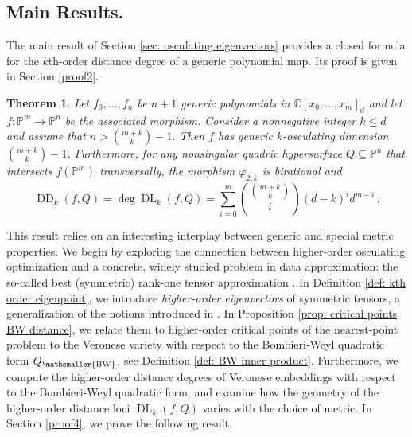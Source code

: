 \documentclass[11pt,reqno]{amsart}
\numberwithin{equation}{section}
\theoremstyle{plain}
\newtheorem{theorem}{Theorem}
\numberwithin{theorem}{section}
\theoremstyle{definition}
\renewcommand{\P}{\mathbb{P}}
\newcommand{\C}{\mathbb{C}}
\newcommand{\DL}{\operatorname{DL}}
\newcommand{\DD}{\operatorname{DD}}
\newcommand{\mBW}{\mathsmaller{\mathrm{BW}}}
\begin{document}
\subsection*{Main Results.} 

The main result of Section \ref{sec: osculating eigenvectors} provides a closed formula for the $k$th-order distance degree of a generic polynomial map. Its proof is given in Section \ref{proof2}.

\begin{theorem}\label{thm: generic ED degree general polynomial map}
Let $f_0,\dots,f_n$ be $n+1$ generic polynomials in $\C[x_0,\dots,x_m]_d$ and let $f\colon\P^m\to\P^n$ be the associated morphism. Consider a nonnegative integer $k\le d$ and assume that $n>\binom{m+k}{k}-1$.
Then $f$ has generic $k$-osculating dimension $\binom{m+k}{k}-1$. Furthermore, for any nonsingular quadric hypersurface $Q\subseteq\P^n$ that intersects $f(\P^m)$ transversally, the morphism $\varphi_{2,k}$ is birational and
\[
\DD_k(f,Q) = \deg\DL_k(f,Q) = \sum_{i=0}^m \binom{\binom{m+k}{k}}{i}(d-k)^id^{m-i}\,.
\]
\end{theorem}

This result relies on an interesting interplay between generic and special metric properties. We begin by exploring the connection between higher-order osculating optimization and a concrete, widely studied problem in data approximation: the so-called best (symmetric) rank-one tensor approximation \cite{banach1938uber,eckart1936approximation,desilva2008tensor,ottaviani2014exact}.
In Definition \ref{def: kth order eigenpoint}, we introduce {\em higher-order eigenvectors} of symmetric tensors, a generalization of the notions introduced in \cite{lim2005singular,Qi05}. In Proposition \ref{prop: critical points BW distance}, we relate them to higher-order critical points of the nearest-point problem to the Veronese variety with respect to the Bombieri-Weyl quadratic form $Q_\mBW$, see Definition \ref{def: BW inner product}.
Furthermore, we compute the higher-order distance degrees of Veronese embeddings with respect to the Bombieri-Weyl quadratic form, and examine how the geometry of the higher-order distance loci $\DL_k(f,Q)$ varies with the choice of metric. In Section \ref{proof4}, we prove the following result.
\end{document}
